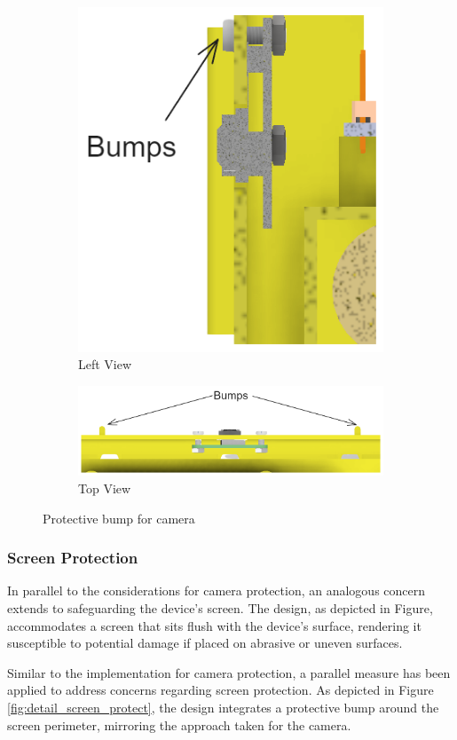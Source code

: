 \begin{figure}[h!]
    \centering
    \begin{subfigure}[c]{0.47\textwidth}
        \begin{minipage}{\textwidth}
            \centering
            \includegraphics[height=4 cm]{texs/Part1/chapter4/image/d12.png}
        \end{minipage}
        \caption{Left View}
        \label{fig:detail_camera_left}
    \end{subfigure}
    \begin{subfigure}[c]{\textwidth}
        \begin{minipage}{\textwidth}
            \centering
            \includegraphics[width=0.75\linewidth]{texs/Part1/chapter4/image/d13.png}
        \end{minipage}
        \caption{Top View}
        \label{fig:detail_camera_top}
    \end{subfigure}
    \caption{Protective bump for camera}
    \label{fig:detail_camera_protect}
\end{figure}

\subsubsection{Screen Protection}
In parallel to the considerations for camera protection, an analogous concern extends to safeguarding the device's screen. The design, as depicted in Figure, accommodates a screen that sits flush with the device's surface, rendering it susceptible to potential damage if placed on abrasive or uneven surfaces.

Similar to the implementation for camera protection, a parallel measure has been applied to address concerns regarding screen protection. As depicted in Figure \ref{fig:detail_screen_protect}, the design integrates a protective bump around the screen perimeter, mirroring the approach taken for the camera.

